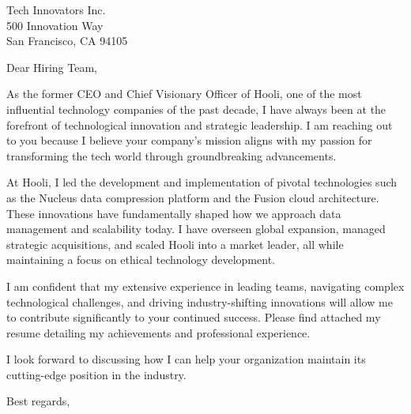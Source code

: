 \documentclass[DIN, 11pt, pagenumber=false, parskip=half,%
               fromalign=left, %
               fromemail=true, fromurl=false, %
               fromfax=true, backaddress=false,
               foldmarks=blmtP, foldmarks=false]{scrlttr2}
\begin{document}
\begin{letter}{
Tech Innovators Inc. \\
500 Innovation Way \\
San Francisco, CA 94105 \\
}

\opening{Dear Hiring Team,}

As the former CEO and Chief Visionary Officer of Hooli, one of the most influential technology companies of the past decade, I have always been at the forefront of technological innovation and strategic leadership. I am reaching out to you because I believe your company's mission aligns with my passion for transforming the tech world through groundbreaking advancements.

At Hooli, I led the development and implementation of pivotal technologies such as the Nucleus data compression platform and the Fusion cloud architecture. These innovations have fundamentally shaped how we approach data management and scalability today. I have overseen global expansion, managed strategic acquisitions, and scaled Hooli into a market leader, all while maintaining a focus on ethical technology development.

I am confident that my extensive experience in leading teams, navigating complex technological challenges, and driving industry-shifting innovations will allow me to contribute significantly to your continued success. Please find attached my resume detailing my achievements and professional experience.

I look forward to discussing how I can help your organization maintain its cutting-edge position in the industry.

\closing{Best regards,}

\end{letter}
\end{document}
